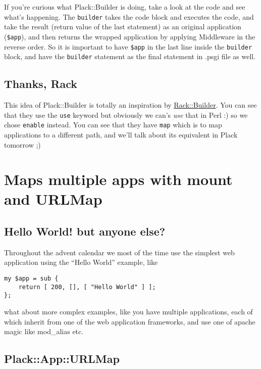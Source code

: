 If you're curious what Plack::Builder is doing, take a look at the code
and see what's happening. The \lstinline!builder! takes the code block
and executes the code, and take the result (return value of the last
statement) as an original application (\lstinline!$app!), and then
returns the wrapped application by applying Middleware in the reverse
order. So it is important to have \lstinline!$app! in the last line
inside the \lstinline!builder! block, and have the \lstinline!builder!
statement as the final statement in .psgi file as well.

\section{Thanks, Rack}\label{thanks-rack}

This idea of Plack::Builder is totally an inspiration by
\href{http://m.onkey.org/2008/11/18/ruby-on-rack-2-rack-builder}{Rack::Builder}.
You can see that they use the \lstinline!use! keyword but obviously we
can's \emph{use} that in Perl :) so we chose \lstinline!enable! instead.
You can see that they have \lstinline!map! which is to map applications
to a different path, and we'll talk about its equivalent in Plack
tomorrow ;)

\chapter{Maps multiple apps with mount and
URLMap}\label{day-12-maps-multiple-apps-with-mount-and-urlmap}

\section{Hello World! but anyone
else?}\label{hello-world-but-anyone-else}

Throughout the advent calendar we most of the time use the simplest web
application using the ``Hello World'' example, like

\begin{lstlisting}
my $app = sub {
    return [ 200, [], [ "Hello World" ] ];
};
\end{lstlisting}

what about more complex examples, like you have multiple applications,
each of which inherit from one of the web application frameworks, and
use one of apache magic like mod\_alias etc.

\section{Plack::App::URLMap}\label{plackappurlmap}

